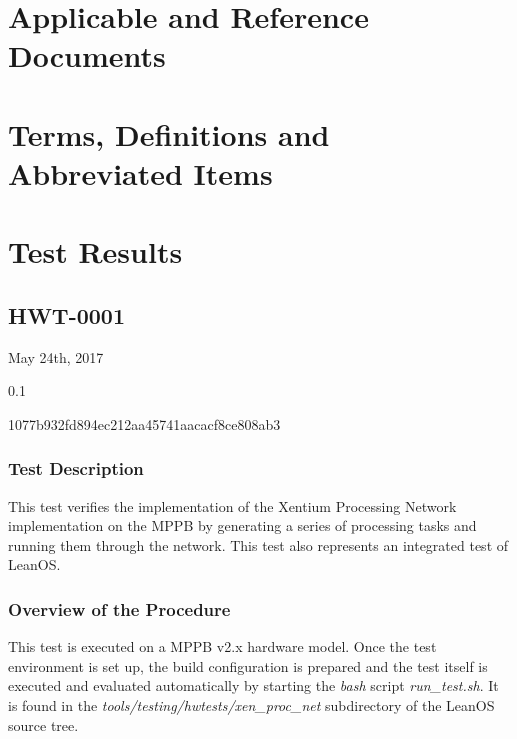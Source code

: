 \chapter{Applicable and Reference Documents} %

\printbibliography[heading=none]


\chapter{Terms, Definitions and Abbreviated Items}
\printglossary[type=acronym]
\printglossary[type=main, style=altlist]


\chapter{Test Results}

\section{HWT-0001}

\begin{description}[labelwidth=4em,leftmargin=\parindent,labelindent=\parindent]
	\item[\textbf{Date}]	May 24th, 2017
	\item[\textbf{Version}]	0.1
	\item[\textbf{Hash}]	1077b932fd894ec212aa45741aacacf8ce808ab3
\end{description}

\subsection*{Test Description}

This test verifies the implementation of the \gls{Xentium} Processing Network
implementation on the \gls{MPPB} by generating a series of processing tasks and
running them through the network. This test also represents an integrated test
of LeanOS.

\subsection*{Overview of the Procedure}

This test is executed on a \gls{MPPB} v2.x hardware model. Once the test
environment is set up, the build configuration is prepared and the test itself
is executed and evaluated automatically by starting the \emph{bash} script
\emph{run\_test.sh}. It is found in the 
\mbox{\emph{tools/testing/hwtests/xen\_proc\_net}} subdirectory of the LeanOS
source tree.


